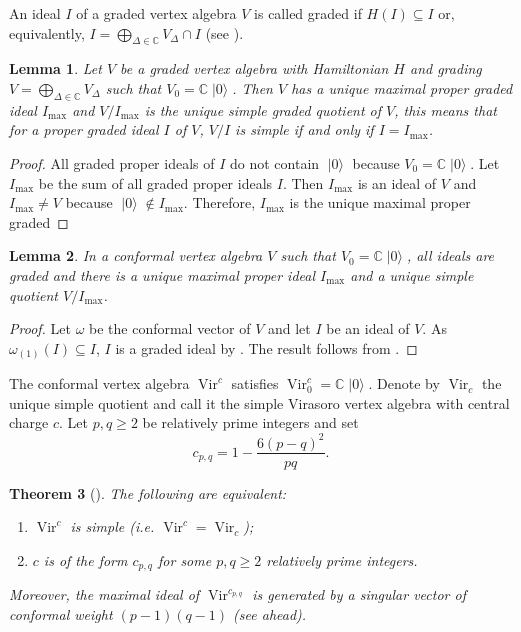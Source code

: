 \documentclass[a4paper, 12pt, reqno]{amsart}
\newtheorem{theorem}{Theorem}[section]
\newtheorem{lemma}[theorem]{Lemma}
\theoremstyle{remark}
\numberwithin{equation}{subsection}
\DeclareMathOperator{\Vir}{Vir}
\DeclareMathOperator{\vac}{|0\rangle}
\begin{document}
An ideal $I$ of a graded vertex algebra $V$ is called graded if $H(I) \subseteq I$ or, equivalently, $I = \bigoplus_{\Delta \in \mathbb{C}}V_{\Delta} \cap I$ (see ).

\begin{lemma}
  \label{lmm:10}
  Let $V$ be a graded vertex algebra with Hamiltonian $H$ and grading $V = \bigoplus_{\Delta \in \mathbb{C}}V_{\Delta}$ such that $V_0 = \mathbb{C}\vac$.
  Then $V$ has a unique maximal proper graded ideal $I_{\max}$ and $V/I_{\max}$ is the unique simple graded quotient of $V$, this means that for a proper graded ideal $I$ of $V$, $V/I$ is simple if and only if $I = I_{\max}$. 
\end{lemma}

\begin{proof}
  All graded proper ideals of $I$ do not contain $\vac$ because $V_0 = \mathbb{C}\vac$.
  Let $I_{\max}$ be the sum of all graded proper ideals $I$.
  Then $I_{\max}$ is an ideal of $V$ and $I_{\max} \neq V$ because $\vac \notin I_{\max}$.
  Therefore, $I_{\max}$ is the unique maximal proper graded
\end{proof}

\begin{lemma}
  \label{lmm:11}
  In a conformal vertex algebra $V$ such that $V_0 = \mathbb{C}\vac$, all ideals are graded and there is a unique maximal proper ideal $I_{\max}$ and a unique simple quotient $V/I_{\max}$.   
\end{lemma}

\begin{proof}
  Let $\omega$ be the conformal vector of $V$ and let $I$ be an ideal of $V$.
  As $\omega_{(1)}(I) \subseteq I$, $I$ is a graded ideal by .
  The result follows from .
\end{proof}

The conformal vertex algebra $\Vir^c$ satisfies $\Vir^c_0 = \mathbb{C}\vac$.
Denote by $\Vir_c$ the unique simple quotient and call it the simple Virasoro vertex algebra with central charge $c$.
Let $p, q \ge 2$ be relatively prime integers and set
\begin{equation*}
  c_{p, q} = 1 - \frac{6(p - q)^2}{pq}.
\end{equation*}

\begin{theorem}[{\cite{gorelik_simplicity_2007}}]
  \label{thr:25}
  The following are equivalent:
  \begin{enumerate}
  \item $\Vir^c$ is simple (i.e. $\Vir^c = \Vir_c$);
  \item $c$ is of the form $c_{p, q}$ for some $p, q \ge 2$ relatively prime integers.
  \end{enumerate}
  Moreover, the maximal ideal of $\Vir^{c_{p, q}}$ is generated by a singular vector of conformal weight $(p - 1)(q - 1)$ (see  ahead).
\end{theorem}
\end{document}
